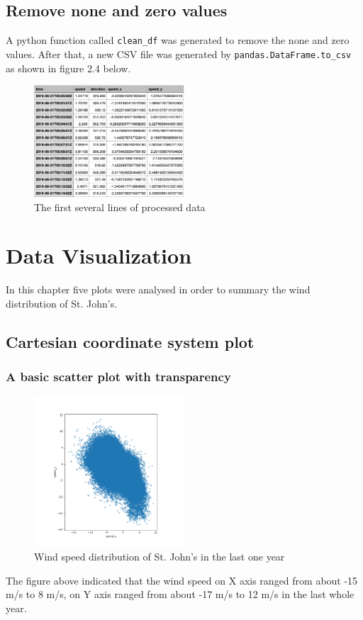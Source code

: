 \documentclass[10pt]{report}
\begin{document}
\section{Remove none and zero values}
A python function called \texttt{clean\_df} was generated to remove the none and zero values. After that, a new CSV file was generated by \texttt{pandas.DataFrame.to\_csv} as shown in figure 2.4 below.
\begin{figure}[h!]
    \centering
    \includegraphics[width=0.50\textwidth]{images/processed_data.png}
    \caption{The first several lines of processed data}
    \label{fig: PaleBlueDot}    
\end{figure}

 \chapter{Data Visualization}
 In this chapter five plots were analysed in order to summary the wind distribution of St. John's.

\section{Cartesian coordinate system plot}

\subsection{A basic scatter plot with transparency}
\begin{figure}[h!]
    \centering
    \includegraphics[width=0.50\textwidth]{images/figure1.png}
    \caption{Wind speed distribution of St. John's in the last one year}
    \label{fig: PaleBlueDot}    
\end{figure}
The figure above indicated that the wind speed on X axis ranged from about -15 m/s to 8 m/s, on Y axis ranged from about -17 m/s to 12 m/s in the last whole year.
\end{document}
